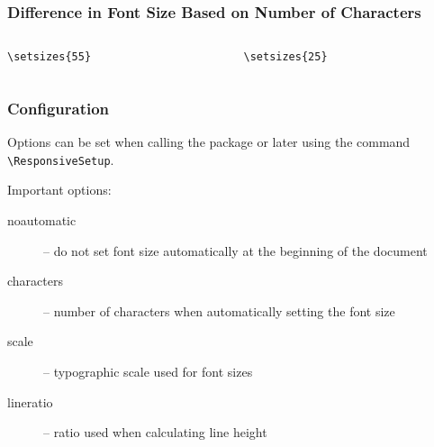 \begin{frame}[fragile]
  \frametitle{Difference in Font Size Based on Number of Characters}
\begin{columns}
  \begin{column}{0.5\textwidth}
\begin{verbatim}
\setsizes{55}
\end{verbatim}

\end{column}
\begin{column}{0.5\textwidth}
\begin{verbatim}
\setsizes{25}
\end{verbatim}

\end{column}
\end{columns}
\end{frame}

\begin{frame}[fragile]
  \frametitle{Configuration}
  Options can be set when calling the package or later using the command \verb|\ResponsiveSetup|.

  Important options:

  \begin{description}
    \item[noautomatic] -- do not set font size automatically at the beginning of the document
    \item[characters] -- number of characters when automatically setting the font size
    \item[scale] -- typographic scale used for font sizes
    \item[lineratio] -- ratio used when calculating line height
  \end{description}

\end{frame}

